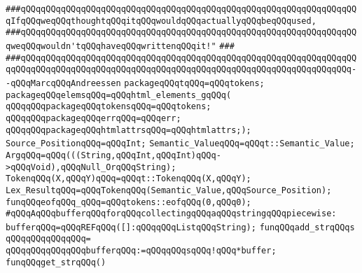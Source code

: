 \verb|###qQQqqQQqqQQqqQQqqQQqqQQqqQQqqQQqqQQqqQQqqQQqqQQqqQQqqQQqqQQqqQQqqQQqIfqQQqweqQQqthoughtqQQqitqQQqwouldqQQqactuallyqQQqbeqQQqused,|\newline
\verb|###qQQqqQQqqQQqqQQqqQQqqQQqqQQqqQQqqQQqqQQqqQQqqQQqqQQqqQQqqQQqqQQqqQQqweqQQqwouldn'tqQQqhaveqQQqwrittenqQQqit!"|\newline
\verb|###|\newline
\verb|###qQQqqQQqqQQqqQQqqQQqqQQqqQQqqQQqqQQqqQQqqQQqqQQqqQQqqQQqqQQqqQQqqQQqqQQqqQQqqQQqqQQqqQQqqQQqqQQqqQQqqQQqqQQqqQQqqQQqqQQqqQQqqQQqqQQqqQQq--qQQqMarcqQQqAndreessen|\newline
\newline
\newline
\verb|packageqQQqtqQQq=qQQqtokens;|\newline
\verb|packageqQQqelemsqQQq=qQQqhtml_elements_gqQQq(|\newline
\verb|qQQqqQQqpackageqQQqtokensqQQq=qQQqtokens;|\newline
\verb|qQQqqQQqpackageqQQqerrqQQq=qQQqerr;|\newline
\verb|qQQqqQQqpackageqQQqhtmlattrsqQQq=qQQqhtmlattrs;);|\newline
\newline
\verb|Source_PositionqQQq=qQQqInt;|\newline
\verb|Semantic_ValueqQQq=qQQqt::Semantic_Value;|\newline
\verb|ArgqQQq=qQQq(((String,qQQqInt,qQQqInt)qQQq->qQQqVoid),qQQqNull_OrqQQqString);|\newline
\verb|TokenqQQq(X,qQQqY)qQQq=qQQqt::TokenqQQq(X,qQQqY);|\newline
\verb|Lex_ResultqQQq=qQQqTokenqQQq(Semantic_Value,qQQqSource_Position);|\newline
\newline
\verb|funqQQqeofqQQq_qQQq=qQQqtokens::eofqQQq(0,qQQq0);|\newline
\newline
\verb|#qQQqAqQQqbufferqQQqforqQQqcollectingqQQqaqQQqstringqQQqpiecewise:|\newline
\verb|bufferqQQq=qQQqREFqQQq([]:qQQqqQQqListqQQqString);|\newline
\newline
\verb|funqQQqadd_strqQQqs|\newline
\verb|qQQqqQQqqQQqqQQq=|\newline
\verb|qQQqqQQqqQQqqQQqbufferqQQq:=qQQqqQQqsqQQq!qQQq*buffer;|\newline
\newline
\verb|funqQQqget_strqQQq()|\newline

